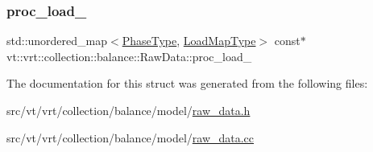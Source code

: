 \subsubsection{\texorpdfstring{proc\+\_\+load\+\_\+}{proc\_load\_}}
{\footnotesize\ttfamily std\+::unordered\+\_\+map$<$\hyperlink{namespacevt_a46ce6733d5cdbd735d561b7b4029f6d7}{Phase\+Type}, \hyperlink{namespacevt_1_1vrt_1_1collection_1_1balance_a5339303db2e1ce964d783a53fd74e6b1}{Load\+Map\+Type}$>$ const$\ast$ vt\+::vrt\+::collection\+::balance\+::\+Raw\+Data\+::proc\+\_\+load\+\_\+}



The documentation for this struct was generated from the following files\+:\begin{DoxyCompactItemize}
\item 
src/vt/vrt/collection/balance/model/\hyperlink{raw__data_8h}{raw\+\_\+data.\+h}\item 
src/vt/vrt/collection/balance/model/\hyperlink{raw__data_8cc}{raw\+\_\+data.\+cc}\end{DoxyCompactItemize}

